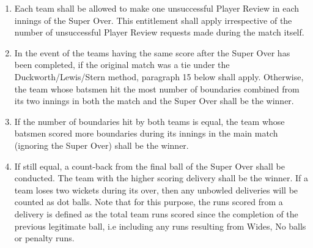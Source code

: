 \documentclass[12pt]{article}
\begin{document}
\begin{enumerate}[label*={\fontsize{9pt}{9pt}\selectfont \arabic*.}]
\vspace{\baselineskip}
	\item {\fontsize{9pt}{10.8pt}\selectfont Each team shall be allowed to make one unsuccessful Player Review in each innings of the Super Over. This entitlement shall apply irrespective of the number of unsuccessful Player Review requests made during the match itself.\par}\par


\vspace{\baselineskip}
	\item {\fontsize{9pt}{10.8pt}\selectfont In the event of the teams having the same score after the Super Over has been completed, if the original match was a tie under the Duckworth/Lewis/Stern method, paragraph 15 below shall apply. Otherwise, the team whose batsmen hit the most number of boundaries combined from its two innings in both the match and the Super Over shall be the winner.\par}\par


\vspace{\baselineskip}
	\item {\fontsize{9pt}{10.8pt}\selectfont If the number of boundaries hit by both teams is equal, the team whose batsmen scored more boundaries during its innings in the main match (ignoring the Super Over) shall be the winner.\par}\par


\vspace{\baselineskip}
	\item {\fontsize{9pt}{10.8pt}\selectfont If still equal, a count-back from the final ball of the Super Over shall be conducted. The team with the higher scoring delivery shall be the winner. If a team loses two wickets during its over, then any unbowled deliveries will be counted as dot balls. Note that for this purpose, the runs scored from a delivery is defined as the total team runs scored since the completion of the previous legitimate ball, i.e including any runs resulting from Wides, No balls or penalty runs.\par}
\end{enumerate}\par


\vspace{\baselineskip}

\vspace{\baselineskip}
\end{document}

